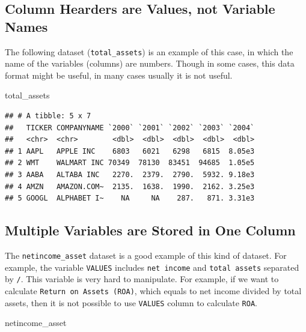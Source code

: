 \documentclass[
]{book}
\newenvironment{Shaded}{\begin{snugshade}}{\end{snugshade}}
\newcommand{\NormalTok}[1]{#1}
\begin{document}
\hypertarget{column-hearders-are-values-not-variable-names}{%
\subsection{Column Hearders are Values, not Variable Names}\label{column-hearders-are-values-not-variable-names}}

The following dataset (\texttt{total\_assets}) is an example of this case, in which the name of the variables (columns) are numbers. Though in some cases, this data format might be useful, in many cases usually it is not useful.

\begin{Shaded}
\begin{Highlighting}[]
\NormalTok{total\_assets}
\end{Highlighting}
\end{Shaded}

\begin{verbatim}
## # A tibble: 5 x 7
##   TICKER COMPANYNAME `2000` `2001` `2002` `2003` `2004`
##   <chr>  <chr>        <dbl>  <dbl>  <dbl>  <dbl>  <dbl>
## 1 AAPL   APPLE INC    6803   6021   6298   6815  8.05e3
## 2 WMT    WALMART INC 70349  78130  83451  94685  1.05e5
## 3 AABA   ALTABA INC   2270.  2379.  2790.  5932. 9.18e3
## 4 AMZN   AMAZON.COM~  2135.  1638.  1990.  2162. 3.25e3
## 5 GOOGL  ALPHABET I~    NA     NA    287.   871. 3.31e3
\end{verbatim}

\hypertarget{multiple-variables-are-stored-in-one-column}{%
\subsection{Multiple Variables are Stored in One Column}\label{multiple-variables-are-stored-in-one-column}}

The \texttt{netincome\_asset} dataset is a good example of this kind of dataset. For example, the variable \texttt{VALUES} includes \texttt{net\ income} and \texttt{total\ assets} separated by \texttt{/}. This variable is very hard to manipulate. For example, if we want to calculate \texttt{Return\ on\ Assets\ (ROA)}, which equals to net income divided by total assets, then it is not possible to use \texttt{VALUES} column to calculate \texttt{ROA}.

\begin{Shaded}
\begin{Highlighting}[]
\NormalTok{netincome\_asset}
\end{Highlighting}
\end{Shaded}
\end{document}
